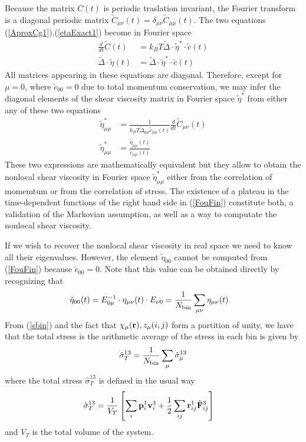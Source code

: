 \documentclass[a4paper,openright,12pt]{book}
\newcommand{\esc}{\!\cdot\!}
\begin{document}
Because  the  matrix  $C(t)$  is periodic  traslation  invariant,  the
Fourier     transform     is     a    diagonal     periodic     matrix
$\tilde{C}_{\mu\nu}(t)=\delta_{\mu\nu}\tilde{C}_{\mu\mu}(t)$.
The two equations (\ref{AproxCg1}),(\ref{etaExact1}) become in Fourier space
\begin{align}
  \frac{d}{dt}\tilde{C}(t)&=  k_BT\tilde{\Delta}\esc \tilde{\eta}^*\esc \tilde{c}(t)
\nonumber\\
 \tilde{\Delta}\esc \tilde{\eta}(t) &=\tilde{\Delta}\esc \tilde{\eta}^*\esc \tilde{c}(t)
\label{Fou1}
\end{align}
All matrices  appearing in  these equations are  diagonal.  Therefore,
except  for $\mu=0$,  where $\tilde{c}_{00}=0$  due to  total momentum
conservation,  we  may  infer  the  diagonal  elements  of  the  shear
viscosity matrix in Fourier space  $\tilde{\eta}^*$ from either any of
these two equations
\begin{align}
  \tilde{\eta}^*_{\mu\mu}&= \frac{1}{ k_BT\tilde{\Delta}_{\mu\mu}  \tilde{c}_{\mu\mu}(t)}\frac{d}{dt}\tilde{C}_{\mu\nu}(t)
\nonumber\\
\tilde{\eta}_{\mu\mu}^*&=\frac{\tilde{\eta}_{\mu\mu}(t) }{\tilde{c}_{\mu\mu}(t)}
\label{FouFin}
\end{align}
These two expressions are mathematically  equivalent but they allow to
obtain   the    nonlocal   shear    viscosity   in    Fourier   space
$\tilde{\eta}_{\mu\mu}^*$ either  from the correlation of  momemtum or
from the  correlation of stress.   The existence  of a plateau  in the
time-dependent  functions of  the  right hand  side in  (\ref{FouFin})
constitute both, a validation of  the Markovian assumption, as well as
a way to computate the nonlocal shear viscosity.

If we wish  to recover the nonlocal shear viscosity  in real space we
need   to  know   all   their  eigenvalues.    However,  the   element
$\tilde{\eta}_{00}$  cannot be  computed  from (\ref{FouFin})  because
$\tilde{c}_{00}=0$.  Note that this value  can be obtained directly by
recognizing that
\begin{align}
    \tilde{\eta}_{00}(t)&=E_{0\mu}^{-1}\cdot\eta_{\mu\nu}(t)\cdot E_{\nu 0}=\frac{1}{N_{\rm bin}}
\sum_{\mu\nu}\eta_{\mu\nu}(t)
\label{eta00}
\end{align}
From
(\ref{sbin}) and the fact that $\chi_\mu({\bf r}),z_{\mu}(i,j)$ form a partition of unity, we have
that the total stress is the arithmetic average of the stress in each bin is given by
\begin{align}
\hat{\sigma}_T^{13}=\frac{1}{N_{\rm bin}}\sum_\mu\hat{\sigma}_\mu^{13}
\label{TotStress2}
\end{align}
where the  total stress $\hat\sigma_T^{13}$ is defined  in the usual way
\begin{align}
\hat{\sigma}_T^{13}&=\frac{1}{V_T}\left[\sum_{i}{\bf p}^1_i{\bf v}^3_i
+\frac{1}{2}\sum_{ij}{\bf r}^1_{ij}\hat{\bf F}^3_{ij}\right]
\label{TotStress}
\end{align}
and $V_T$ is the total volume of the system. 
\end{document}
